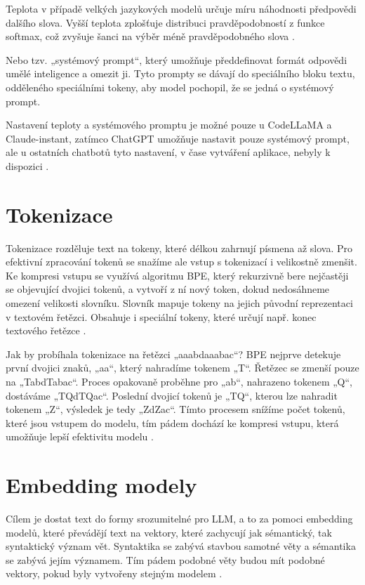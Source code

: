 \documentclass[FM,DP]{tulthesis}
\begin{document}
		Teplota v případě velkých jazykových modelů určuje míru náhodnosti předpovědi dalšího slova. Vyšší teplota zplošťuje distribuci pravděpodobností z funkce softmax, což zvyšuje šanci na výběr méně pravděpodobného slova \cite{llm_parameters}.
		
		Nebo tzv. „systémový prompt“, který umožňuje předdefinovat formát odpovědi umělé inteligence a omezit ji. Tyto prompty se dávají do speciálního bloku textu, odděleného speciálními tokeny, aby model pochopil, že se jedná o systémový prompt. 
		
		Nastavení teploty a systémového promptu je možné pouze u CodeLLaMA a Claude-instant, zatímco ChatGPT umožňuje nastavit pouze systémový prompt, ale u ostatních chatbotů tyto nastavení, v čase vytváření aplikace, nebyly k dispozici \cite{llm_parameters}.
		
		\section{Tokenizace}
		Tokenizace rozděluje text na tokeny, které délkou zahrnují písmena až slova. Pro efektivní zpracování tokenů se snažíme ale vstup s tokenizací i velikostně zmenšit. Ke kompresi vstupu se využívá algoritmu BPE, který rekurzivně bere nejčastěji se objevující dvojici tokenů, a vytvoří z ní nový token, dokud nedosáhneme omezení velikosti slovníku. Slovník mapuje tokeny na jejich původní reprezentaci v textovém řetězci. Obsahuje i speciální tokeny, které určují např. konec textového řetězce \cite{rothman2021transformers}. 
		
		Jak by probíhala tokenizace na řetězci „aaabdaaabac“? BPE nejprve detekuje první dvojici znaků, „aa“, který nahradíme tokenem „T“. Řetězec se zmenší pouze na „TabdTabac“. Proces opakovaně proběhne pro „ab“, nahrazeno tokenem „Q“, dostáváme „TQdTQac“. Poslední dvojicí tokenů je „TQ“, kterou lze nahradit tokenem „Z“, výsledek je tedy „ZdZac“. Tímto procesem snížíme počet tokenů, které jsou vstupem do modelu, tím pádem dochází ke kompresi vstupu, která umožňuje lepší efektivitu modelu \cite{rothman2021transformers}.
		
		\section{Embedding modely}
		Cílem je dostat text do formy srozumitelné pro LLM, a to za pomoci embedding modelů, které převádějí text na vektory, které zachycují jak sémantický, tak syntaktický význam vět. Syntaktika se zabývá stavbou samotné věty a sémantika se zabývá jejím významem. Tím pádem podobné věty budou mít podobné vektory, pokud byly vytvořeny stejným modelem \cite{embeddings} \cite{embeddings2}.
		
\end{document}
